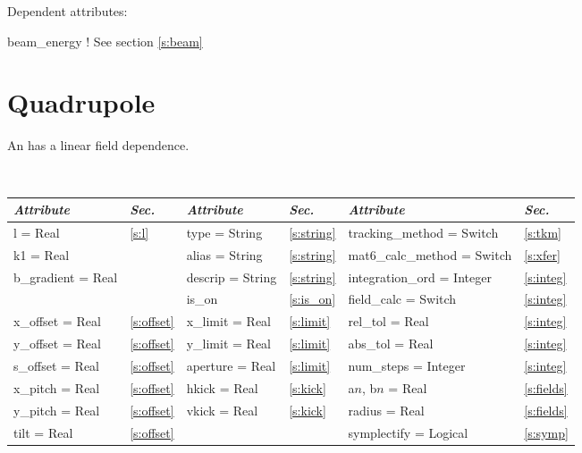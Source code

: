 \vskip0.05in \noindent
Dependent attributes:
\begin{example}
  beam\_energy  ! See section \ref{s:beam}
\end{example}

\section{Quadrupole}
\label{s:quad}

An  has a linear field dependence.

\toffset
\begin{center}
\tt
\begin{tabular}{|l|l||l|l||l|l|} \hline
  {\sl Attribute} & {\sl Sec.}  & {\sl Attribute} & {\sl Sec.} & {\sl Attribute} & {\sl Sec.} \\ \hline
  l        = Real       & \ref{s:l}      & type = String      & \ref{s:string} & tracking\_method = Switch   & \ref{s:tkm}   \\ \hline
  k1       = Real       &                & alias = String     & \ref{s:string} & mat6\_calc\_method = Switch & \ref{s:xfer}  \\ \hline
  b\_gradient = Real    &                & descrip = String   & \ref{s:string} & integration\_ord = Integer  & \ref{s:integ} \\ \hline
                        &                & is\_on             & \ref{s:is_on}  & field\_calc = Switch        & \ref{s:integ} \\ \hline
  x\_offset  = Real     & \ref{s:offset} & x\_limit = Real    & \ref{s:limit}  & rel\_tol = Real             & \ref{s:integ} \\ \hline
  y\_offset  = Real     & \ref{s:offset} & y\_limit = Real    & \ref{s:limit}  & abs\_tol = Real             & \ref{s:integ} \\ \hline
  s\_offset  = Real     & \ref{s:offset} & aperture = Real    & \ref{s:limit}  & num\_steps = Integer        & \ref{s:integ} \\ \hline
  x\_pitch = Real       & \ref{s:offset} & hkick    = Real    & \ref{s:kick}   & a$n$, b$n$ = Real           & \ref{s:fields}\\ \hline
  y\_pitch = Real       & \ref{s:offset} & vkick    = Real    & \ref{s:kick}   & radius = Real               & \ref{s:fields}\\ \hline
  tilt     = Real       & \ref{s:offset} &                    &                & symplectify = Logical       & \ref{s:symp}  \\ \hline
\end{tabular}
\end{center}
\toffset

